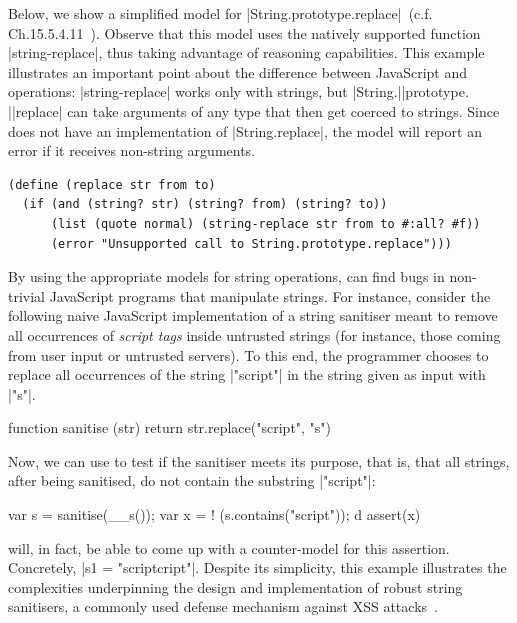 Below, we show a simplified \rosette model for \jsinline|String.prototype.replace|~(c.f. Ch.15.5.4.11~\cite{ecma}).
Observe that this model uses the natively supported function \schemeinline|string-replace|, 
thus taking advantage of \rosette reasoning capabilities.
This example illustrates an important point about the difference between JavaScript and
\rosette operations: \schemeinline|string-replace| works only with strings, but \jsinline|String.|\jsinline|prototype. |\jsinline|replace| can take arguments of any type that then get coerced to strings. Since \JSComp does not have an implementation of \jsinline|String.replace|, the \rosette model will report an error if it receives non-string arguments.
\begin{lstlisting}
(define (replace str from to)
  (if (and (string? str) (string? from) (string? to))
      (list (quote normal) (string-replace str from to #:all? #f))
      (error "Unsupported call to String.prototype.replace")))
\end{lstlisting}

By using the appropriate \rosette models for string operations, \jilette can find bugs in  
non-trivial JavaScript programs that manipulate strings. For instance, consider 
the following naive JavaScript implementation of a string sanitiser meant to remove 
all occurrences of \emph{script tags} inside untrusted strings (for instance, those coming 
from user input or untrusted servers).
To this end, the programmer chooses to 
replace all occurrences of the string \jsinline|"script"| in the string given 
as input with \jsinline|"s"|. 
\begin{lstjsex}
function sanitise (str) { return str.replace("script", "s") }
\end{lstjsex}
Now, we can use \jilette to test if the sanitiser meets its purpose, that is, that all
strings, after being sanitised, do not contain the substring \jsinline|"script"|:
\begin{lstjsex}
var s = sanitise(__s()); 
var x = ! (s.contains("script")); d
assert(x) 
\end{lstjsex}
\jilette will, in fact, be able to come up with a counter-model for this assertion. Concretely, \jsinline|s1 = "scriptcript"|. Despite its simplicity, this example illustrates the complexities underpinning the 
design and implementation of robust string sanitisers, a commonly  
used defense mechanism against XSS attacks~\cite{song}. 
 
 

 
 

%






